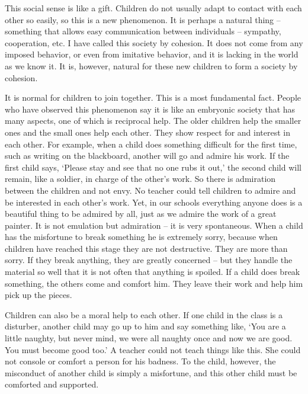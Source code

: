 \documentclass[lang=cn,10pt]{elegantbook}
\begin{document}
This social sense is like a gift. Children do not usually adapt to contact with each other so easily, so this is a new phenomenon. It is perhaps a natural thing – something that allows easy communication between individuals – sympathy, cooperation, etc. I have called this society by cohesion. It does not come from any imposed behavior, or even from imitative behavior, and it is lacking in the world as we know it. It is, however, natural for these new children to form a society by cohesion.

It is normal for children to join together. This is a most fundamental fact. People who have observed this phenomenon say it is like an embryonic society that has many aspects, one of which is reciprocal help. The older children help the smaller ones and the small ones help each other. They show respect for and interest in each other. For example, when a child does something difficult for the first time, such as writing on the blackboard, another will go and admire his work. If the first child says, ‘Please stay and see that no one rubs it out,’ the second child will remain, like a soldier, in charge of the other’s work. So there is admiration between the children and not envy. No teacher could tell children to admire and be interested in each other's work. Yet, in our schools everything anyone does is a beautiful thing to be admired by all, just as we admire the work of a great painter. It is not emulation but admiration – it is very spontaneous. When a child has the misfortune to break something he is extremely sorry, because when children have reached this stage they are not destructive. They are more than sorry. If they break anything, they are greatly concerned – but they handle the material so well that it is not often that anything is spoiled. If a child does break something, the others come and comfort him. They leave their work and help him pick up the pieces.

Children can also be a moral help to each other. If one child in the class is a disturber, another child may go up to him and say something like, ‘You are a little naughty, but never mind, we were all naughty once and now we are good. You must become good too.’ A teacher could not teach things like this. She could not console or comfort a person for his badness. To the child, however, the misconduct of another child is simply a misfortune, and this other child must be comforted and supported.
\end{document}
